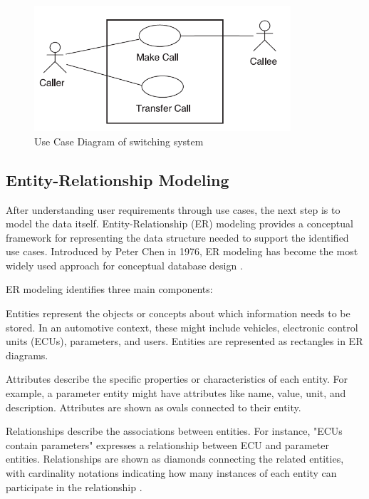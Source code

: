 \begin{figure}[ht]
    \centering
    \includegraphics[width=0.85\textwidth]{figures/use_case_diagram.png}
    \caption{Use Case Diagram of switching system \cite{jacobson2004use}}
    \label{fig:use-case-diagram}
\end{figure}

\subsection{Entity-Relationship Modeling}
\label{subsec:entity-relationship-modeling}

After understanding user requirements through use cases, the next step is to model the data itself. Entity-Relationship (ER) modeling provides a conceptual framework for representing the data structure needed to support the identified use cases. Introduced by Peter Chen in 1976, ER modeling has become the most widely used approach for conceptual database design \cite{chen1976entity}.

ER modeling identifies three main components:

Entities represent the objects or concepts about which information needs to be stored. In an automotive context, these might include vehicles, electronic control units (ECUs), parameters, and users. Entities are represented as rectangles in ER diagrams.

Attributes describe the specific properties or characteristics of each entity. For example, a parameter entity might have attributes like name, value, unit, and description. Attributes are shown as ovals connected to their entity.

Relationships describe the associations between entities. For instance, "ECUs contain parameters" expresses a relationship between ECU and parameter entities. Relationships are shown as diamonds connecting the related entities, with cardinality notations indicating how many instances of each entity can participate in the relationship \cite{elmasri2015fundamentals}.

